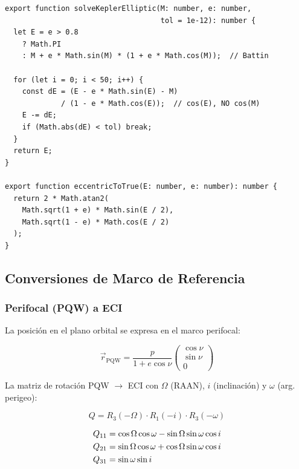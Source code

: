 \documentclass[12pt,a4paper]{article}
\begin{document}
\begin{lstlisting}[caption={Solucionador de Kepler (KeplerSolver.ts)}, label=lst:kepler]
export function solveKeplerElliptic(M: number, e: number,
                                    tol = 1e-12): number {
  let E = e > 0.8
    ? Math.PI
    : M + e * Math.sin(M) * (1 + e * Math.cos(M));  // Battin

  for (let i = 0; i < 50; i++) {
    const dE = (E - e * Math.sin(E) - M)
             / (1 - e * Math.cos(E));  // cos(E), NO cos(M)
    E -= dE;
    if (Math.abs(dE) < tol) break;
  }
  return E;
}

export function eccentricToTrue(E: number, e: number): number {
  return 2 * Math.atan2(
    Math.sqrt(1 + e) * Math.sin(E / 2),
    Math.sqrt(1 - e) * Math.cos(E / 2)
  );
}
\end{lstlisting}

\subsection{Conversiones de Marco de Referencia}

\subsubsection{Perifocal (PQW) a ECI}

La posici\'on en el plano orbital se expresa en el marco perifocal:

\begin{equation}
  \vec{r}_{\text{PQW}} = \frac{p}{1 + e\cos\nu}
  \begin{pmatrix}\cos\nu \\ \sin\nu \\ 0\end{pmatrix}
\end{equation}

La matriz de rotaci\'on PQW $\to$ ECI con $\Omega$ (RAAN), $i$ (inclinaci\'on) y $\omega$ (arg. perigeo):

\begin{equation}
  Q = R_3(-\Omega)\cdot R_1(-i)\cdot R_3(-\omega)
\end{equation}

\begin{align}
  Q_{11} &= \cos\Omega\cos\omega - \sin\Omega\sin\omega\cos i \notag\\
  Q_{21} &= \sin\Omega\cos\omega + \cos\Omega\sin\omega\cos i \notag\\
  Q_{31} &= \sin\omega\sin i \notag
\end{align}
\end{document}
